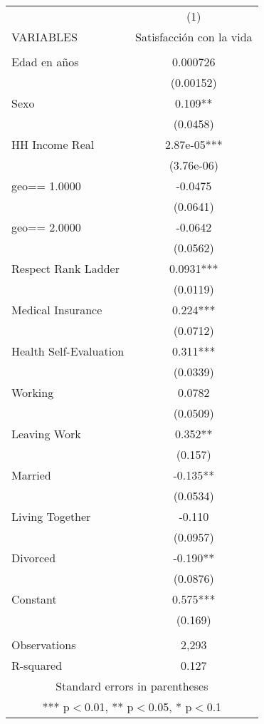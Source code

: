 \documentclass[]{article}
\begin{document}
\begin{tabular}{lc} \hline
 & (1) \\
VARIABLES & Satisfacción con la vida \\ \hline
 &  \\
Edad en años & 0.000726 \\
 & (0.00152) \\
Sexo & 0.109** \\
 & (0.0458) \\
HH Income Real & 2.87e-05*** \\
 & (3.76e-06) \\
geo==     1.0000 & -0.0475 \\
 & (0.0641) \\
geo==     2.0000 & -0.0642 \\
 & (0.0562) \\
Respect Rank Ladder & 0.0931*** \\
 & (0.0119) \\
Medical Insurance & 0.224*** \\
 & (0.0712) \\
Health Self-Evaluation & 0.311*** \\
 & (0.0339) \\
Working & 0.0782 \\
 & (0.0509) \\
Leaving Work & 0.352** \\
 & (0.157) \\
Married & -0.135** \\
 & (0.0534) \\
Living Together & -0.110 \\
 & (0.0957) \\
Divorced & -0.190** \\
 & (0.0876) \\
Constant & 0.575*** \\
 & (0.169) \\
 &  \\
Observations & 2,293 \\
 R-squared & 0.127 \\ \hline
\multicolumn{2}{c}{ Standard errors in parentheses} \\
\multicolumn{2}{c}{ *** p$<$0.01, ** p$<$0.05, * p$<$0.1} \\
\end{tabular}
\end{document}
